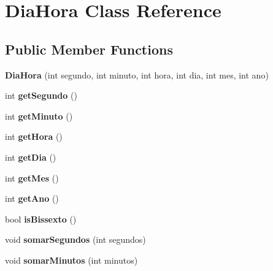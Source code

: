 \hypertarget{classDiaHora}{}\section{Dia\+Hora Class Reference}
\label{classDiaHora}
\subsection*{Public Member Functions}
\begin{DoxyCompactItemize}
\item 
\mbox{\label{classDiaHora_a20ba12c01f56c7a2c8f7c0eabd02546d}} 
{\bfseries Dia\+Hora} (int segundo, int minuto, int hora, int dia, int mes, int ano)
\item 
\mbox{\label{classDiaHora_a63c7343f89d790e3e18206da899d3a59}} 
int {\bfseries get\+Segundo} ()
\item 
\mbox{\label{classDiaHora_a9ade7c903104f9eaeeae88575329b023}} 
int {\bfseries get\+Minuto} ()
\item 
\mbox{\label{classDiaHora_a5a1bf8afdd049b060382ec164345de89}} 
int {\bfseries get\+Hora} ()
\item 
\mbox{\label{classDiaHora_a5e0b02185ac3e6a67200a2f39d72a962}} 
int {\bfseries get\+Dia} ()
\item 
\mbox{\label{classDiaHora_a6193e1f37f83cb4136b0775f3e98ca27}} 
int {\bfseries get\+Mes} ()
\item 
\mbox{\label{classDiaHora_aed27f59c90bd6ffe1134cf0b3c7c9f75}} 
int {\bfseries get\+Ano} ()
\item 
\mbox{\label{classDiaHora_a414604198da5c00ad5f73c235c56879f}} 
bool {\bfseries is\+Bissexto} ()
\item 
\mbox{\label{classDiaHora_aec78e531962db2d38989d6708b4d5e32}} 
void {\bfseries somar\+Segundos} (int segundos)
\item 
\mbox{\label{classDiaHora_af7d5b8efc889f536eeabf15fb786b200}} 
void {\bfseries somar\+Minutos} (int minutos)

\end{DoxyCompactItemize}
